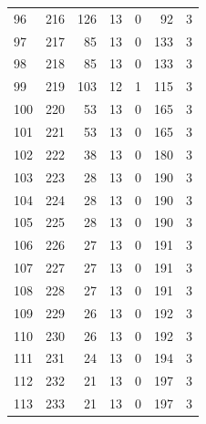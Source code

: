 \documentclass[a4paper,twoside,12pt]{book}
\begin{document}
\begin{appendices}
\begin{table}
\begin{tabular}{lrrrrrr}
		\bottomrule
	\end{tabular}		
\end{table}
\begin{table}
	\centering
	\begin{tabular}{lrrrrrr}
		\toprule
		96  &    216 &       126 &        13 &               0 &              92 &         3 \\
		97  &    217 &        85 &        13 &               0 &             133 &         3 \\
		98  &    218 &        85 &        13 &               0 &             133 &         3 \\
		99  &    219 &       103 &        12 &               1 &             115 &         3 \\
		100 &    220 &        53 &        13 &               0 &             165 &         3 \\
		101 &    221 &        53 &        13 &               0 &             165 &         3 \\
		102 &    222 &        38 &        13 &               0 &             180 &         3 \\
		103 &    223 &        28 &        13 &               0 &             190 &         3 \\
		104 &    224 &        28 &        13 &               0 &             190 &         3 \\
		105 &    225 &        28 &        13 &               0 &             190 &         3 \\
		106 &    226 &        27 &        13 &               0 &             191 &         3 \\
		107 &    227 &        27 &        13 &               0 &             191 &         3 \\
		108 &    228 &        27 &        13 &               0 &             191 &         3 \\
		109 &    229 &        26 &        13 &               0 &             192 &         3 \\
		110 &    230 &        26 &        13 &               0 &             192 &         3 \\
		111 &    231 &        24 &        13 &               0 &             194 &         3 \\
		112 &    232 &        21 &        13 &               0 &             197 &         3 \\
		113 &    233 &        21 &        13 &               0 &             197 &         3 \\

\end{tabular}
\end{table}
\end{appendices}
\end{document}
